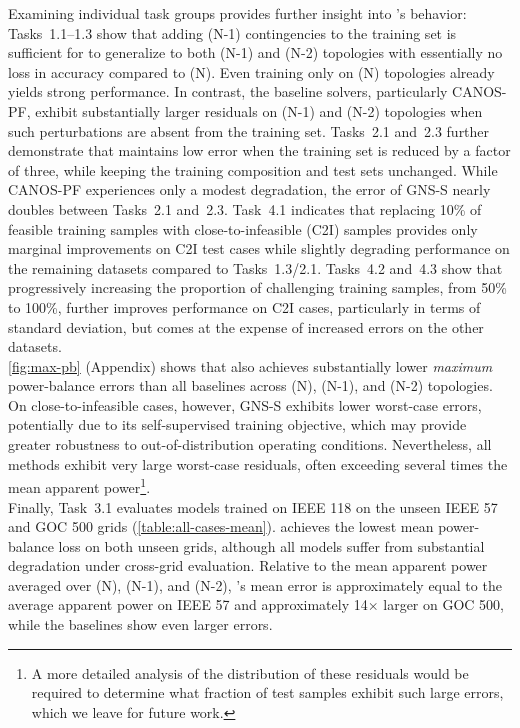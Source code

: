 Examining individual task groups provides further insight into \genco's behavior: Tasks~1.1--1.3 show that adding (N{-}1) contingencies to the training set is sufficient for \genco to generalize to both (N{-}1) and (N{-}2) topologies with essentially no loss in accuracy compared to (N). Even training only on (N) topologies already yields strong performance. In contrast, the baseline solvers, particularly CANOS-PF, exhibit substantially larger residuals on (N{-}1) and (N{-}2) topologies when such perturbations are absent from the training set. Tasks~2.1 and~2.3 further demonstrate that \genco maintains low error when the training set is reduced by a factor of three, while keeping the training composition and test sets unchanged. While CANOS-PF experiences only a modest degradation, the error of GNS-S nearly doubles between Tasks~2.1 and~2.3. Task~4.1 indicates that replacing 10\% of feasible training samples with close-to-infeasible (C2I) samples provides only marginal improvements on C2I test cases while slightly degrading performance on the remaining datasets compared to Tasks~1.3/2.1. Tasks~4.2 and~4.3 show that progressively increasing the proportion of challenging training samples, from 50\% to 100\%, further improves performance on C2I cases, particularly in terms of standard deviation, but comes at the expense of increased errors on the other datasets.\\

\cref{fig:max-pb} (Appendix) shows that \genco also achieves substantially lower \emph{maximum} power-balance errors than all baselines across (N), (N{-}1), and (N{-}2) topologies. On close-to-infeasible cases, however, GNS-S exhibits lower worst-case errors, potentially due to its self-supervised training objective, which may provide greater robustness to out-of-distribution operating conditions. Nevertheless, all methods exhibit very large worst-case residuals, often exceeding several times the mean apparent power\footnote{A more detailed analysis of the distribution of these residuals would be required to determine what fraction of test samples exhibit such large errors, which we leave for future work.}.\\








Finally, Task~3.1 evaluates models trained on IEEE 118 on the unseen IEEE 57 and GOC 500 grids (\cref{table:all-cases-mean}). \genco achieves the lowest mean power-balance loss on both unseen grids, although all models suffer from substantial degradation under cross-grid evaluation. Relative to the mean apparent power averaged over (N), (N{-}1), and (N{-}2), \genco's mean error is approximately equal to the average apparent power on IEEE 57 and approximately 14$\times$ larger on GOC 500, while the baselines show even larger errors.\\ %





